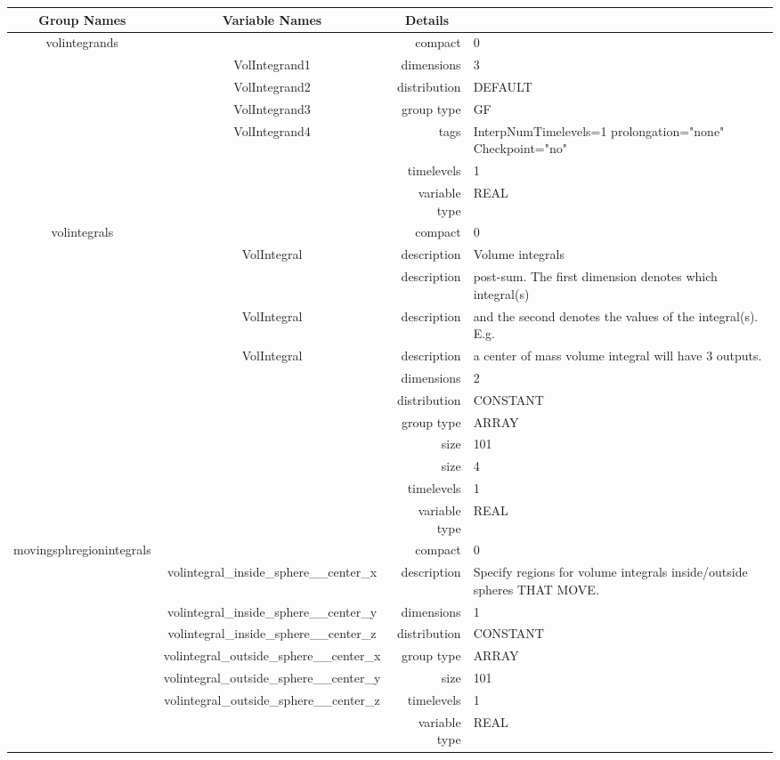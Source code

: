 \begin{tabular*}{150mm}{|c|c@{\extracolsep{\fill}}|rl|} \hline 
~ {\bf Group Names} ~ & ~ {\bf Variable Names} ~  &{\bf Details} ~ & ~\\ 
\hline 
volintegrands &  & compact & 0 \\ 
 & VolIntegrand1 & dimensions & 3 \\ 
 & VolIntegrand2 & distribution & DEFAULT \\ 
 & VolIntegrand3 & group type & GF \\ 
 & VolIntegrand4 & tags & InterpNumTimelevels=1 prolongation="none" Checkpoint="no" \\ 
 &  & timelevels & 1 \\ 
 &  & variable type & REAL \\ 
\hline 
volintegrals &  & compact & 0 \\ 
 & VolIntegral & description & Volume integrals \\ 
& ~ & description &  post-sum. The first dimension denotes which integral(s) \\ 
 & VolIntegral & description &  and the second denotes the values of the integral(s). E.g. \\ 
 & VolIntegral & description &  a center of mass volume integral will have 3 outputs. \\ 
 &  & dimensions & 2 \\ 
 &  & distribution & CONSTANT \\ 
 &  & group type & ARRAY \\ 
 &  & size & 101 \\ 
& ~ & size & 4 \\ 
 &  & timelevels & 1 \\ 
 &  & variable type & REAL \\ 
\hline 
movingsphregionintegrals &  & compact & 0 \\ 
 & volintegral\_inside\_sphere\_\_center\_x & description & Specify regions for volume integrals inside/outside spheres THAT MOVE. \\ 
 & volintegral\_inside\_sphere\_\_center\_y & dimensions & 1 \\ 
 & volintegral\_inside\_sphere\_\_center\_z & distribution & CONSTANT \\ 
 & volintegral\_outside\_sphere\_\_center\_x & group type & ARRAY \\ 
 & volintegral\_outside\_sphere\_\_center\_y & size & 101 \\ 
 & volintegral\_outside\_sphere\_\_center\_z & timelevels & 1 \\ 
 &  & variable type & REAL \\ 
\hline 
\end{tabular*} 


